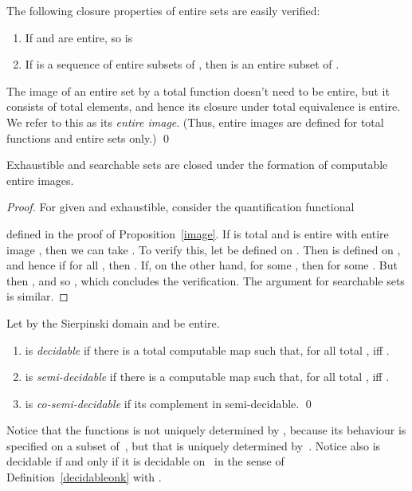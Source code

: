 \documentclass{LMCS}
\newcommand{\licsmath}[1]{}
\begin{document}
\medskip
The following closure properties of entire sets are easily verified:
\begin{enumerate}
\item If  and  are entire, so is 
\item If  is a sequence of entire subsets of , then
 is an entire subset of .
\end{enumerate}
\begin{defi}
  The image of an entire set by a total function doesn't need to be
  entire, but it consists of total elements, and hence its closure
  under total equivalence is entire. We refer to this as its
  \emph{entire image}. (Thus, entire images are defined for total
  functions and entire sets only.) \qed
\end{defi}


\begin{prop} \label{image:bis} Exhaustible and searchable sets are
  closed under the formation of computable entire images.
\end{prop}
\begin{proof}
For given  and  exhaustible,
consider the quantification functional
\licsmath{\forall_{f(K)}(q)=\forall x \in K.q(f(x)).}
defined in the proof of Proposition~\ref{image}.
If  is total and  is
entire with entire image , then we can take
. To verify this, let  be defined on
. Then  is defined on , and hence if
 for all , then . If, on the
other hand,  for some , then  for
some . But then , and so
, which concludes the verification.
The argument for searchable sets is similar. 
\end{proof}

\begin{defi} \label{semidecidable} \leavevmode Let  by the Sierpinski domain and 
  be entire.
  \begin{enumerate}
  \item  is \emph{decidable} if there is
    a total computable map  such that, for
    all total ,  iff .

  \item  is \emph{semi-decidable} if
    there is a computable map  such that,
    for all total ,  iff .

  \item  is \emph{co-semi-decidable} if its complement in
     semi-decidable. \qed
  \end{enumerate}
\end{defi}
Notice that the functions  is not uniquely determined by ,
because its behaviour is specified on a subset of~, but that
 is uniquely determined by~. Notice also 
 is decidable if and only if it is decidable on~ in the sense of
Definition~\ref{decidableonk} with .
\end{document}
